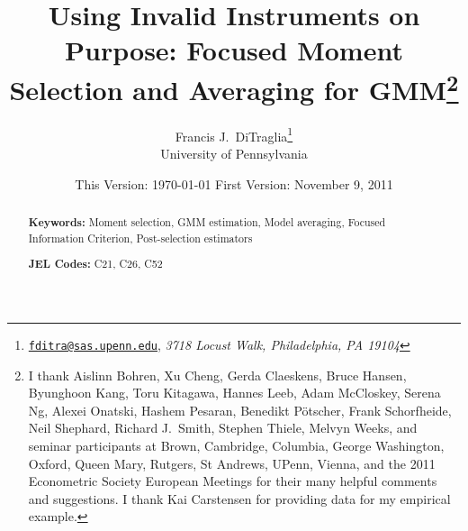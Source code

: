 \documentclass[12pt]{article}
\begin{document}
\title{Using Invalid Instruments on Purpose: Focused Moment Selection and Averaging for GMM\footnote{I thank Aislinn Bohren, Xu Cheng, Gerda Claeskens, Bruce Hansen, Byunghoon Kang, Toru Kitagawa, Hannes Leeb, Adam McCloskey, Serena Ng, Alexei Onatski, Hashem Pesaran, Benedikt P\"{o}tscher, Frank Schorfheide, Neil Shephard, Richard J.\ Smith, Stephen Thiele, Melvyn Weeks, and seminar participants at 
Brown, Cambridge, Columbia, George Washington, Oxford, Queen Mary, Rutgers, St Andrews, UPenn, Vienna, and the 2011 Econometric Society European Meetings for their many helpful comments and suggestions. I thank Kai Carstensen for providing data for my empirical example.}}

\author{Francis J.\ DiTraglia\footnote{
\href{mailto:fditra@sas.upenn.edu}{\texttt{fditra@sas.upenn.edu}}, \emph{3718 Locust Walk, Philadelphia, PA 19104}}
 \\ University of Pennsylvania}

\date{\footnotesize This Version: \today \hspace{0.5em} First Version: November 9, 2011}

\maketitle 
\begin{abstract}
	

	\bigskip
	\noindent\textbf{Keywords:} Moment selection, GMM estimation, Model averaging, Focused Information Criterion, Post-selection estimators

	\medskip
	\noindent\textbf{JEL Codes:} C21, C26, C52 
\end{abstract}
















\appendix







%



\end{document}
